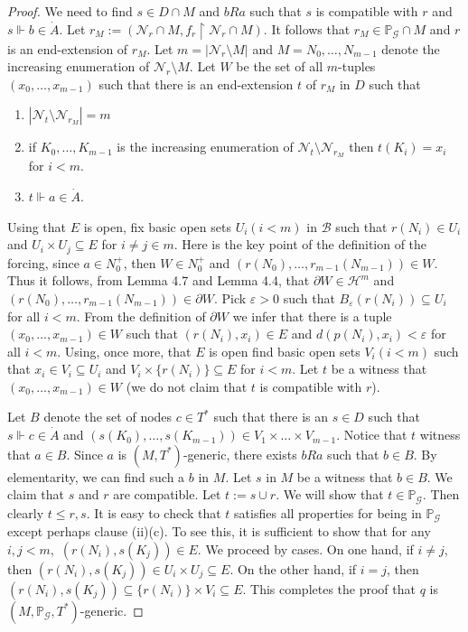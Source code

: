 \documentclass{amsart}
\theoremstyle{definition}
\renewcommand{\P}{\mathbb{P}}
\begin{document}
\begin{proof}
We need to find $s\in D\cap M$ and $bRa$ such that $s$ is compatible with $r$ and $s\Vdash b\in\dot A$.  Let $r_M:=(\mathcal{N}_r\cap M, f_r\restriction\mathcal{N}_r\cap M).$ It follows that $r_M\in \P_\mathcal{G}\cap M$ and $r$ is an end-extension of $r_M$. Let $m=|\mathcal{N}_r\setminus M|$ and $M=N_0,\dots,N_{m-1}$ denote the increasing enumeration of  $\mathcal{N}_r\setminus M$. Let $W$ be the set of all $m$-tuples $(x_0,\dots,x_{m-1}) $ such that there is an end-extension $t$ of $r_M$ in $D$ such that
\begin{enumerate}[{\rm(a)}]
    \item
    $|\mathcal{N}_t\setminus\mathcal{N}_{r_M}|=m$
    \item if $K_0,\dots,K_{m-1}$ is the increasing enumeration of $\mathcal{N}_t\setminus\mathcal{N}_{r_M}$ then $t(K_i)=x_i$ for $i<m$.
    \item $t\Vdash a\in \dot A$.
\end{enumerate}
Using that $E$ is open, fix basic open sets $U_i (i<m)$ in $\mathcal{B}$ such that $r(N_i)\in U_i$ and $U_i\times U_j\subseteq E$ for $i\ne j \in m.$
Here is the key point of the definition of the forcing, since $a\in N_0^+$, then $W\in N_0^+$ and $(r(N_0),\dots,r_{m-1}(N_{m-1}))\in W$. Thus it follows, from Lemma 4.7 and Lemma 4.4, that $\partial W\in \mathcal{H}^m $ and $(r(N_0),\dots,r_{m-1}(N_{m-1}))\in \partial W.$ Pick $\varepsilon>0$ such that $B_{\varepsilon}(r(N_i))\subseteq U_i$ for all $i<m$. From the definition of $\partial W$ we infer that there is a tuple $(x_0,\dots,x_{m-1})\in W$ such that $(r(N_i),x_i)\in E$ and $d(p(N_i),x_i)<\varepsilon$ for all $i<m$. Using, once more,  that $E$ is open find basic open sets $V_i (i<m)$ such that $x_i\in V_i\subseteq U_i$ and $V_i\times \{r(N_i)\}\subseteq E$ for $i<m$. Let $t$ be  a witness that  $(x_0,\dots,x_{m-1})\in W$ (we do not claim that $t$ is compatible with $r$).

Let $B$ denote the set of nodes $c\in T^*$ such that there is an $s\in D$ such that $s\Vdash c\in \dot A$
and $(s(K_0),\dots,s(K_{m-1}))\in V_1\times\dots\times V_{m-1}$. Notice that $t$  witness that $a\in B$. Since $a$ is $(M,T^*)$-generic, there exists $bRa$ such that $b\in B$.  By elementarity, we can find such a $b$ in $M$. Let $s$ in $M$ be a witness that $b\in B$. We claim that $s$ and $r$ are compatible. Let $t:=s\cup r$. We will show that $t\in \P_\mathcal{G}$. Then clearly $t\leq r,s$. It is easy to check that $t$ satisfies all properties for being in $\P_\mathcal{G}$ except perhaps clause (ii)(c). To see this, it is sufficient to show that for any $i,j<m,$ $(r(N_i),s(K_j))\in E.$ We proceed by cases. On one hand, if $i\ne j$, then $(r(N_i),s(K_j))\in U_i\times U_j\subseteq E$. On the other hand, if $i=j$, then $(r(N_i),s(K_j))\subseteq \{r(N_i)\}\times V_i\subseteq E$. This completes the proof that $q$ is $(M,\P_\mathcal{G},T^*)$-generic.


\end{proof}
\end{document}
